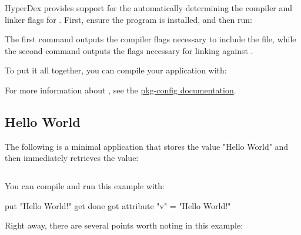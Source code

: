 HyperDex provides support for the automatically determining the compiler and
linker flags for .  First, ensure the 
program is installed, and then run:

\begin{consolecode}
\end{consolecode}

The first command outputs the compiler flags necessary to include the
 file, while the second command outputs the flags
necessary for linking against .

To put it all together, you can compile your application with:

\begin{consolecode}
\end{consolecode}

For more information about , see the
\href{http://people.freedesktop.org/~dbn/pkg-config-guide.html#using}{pkg-config
documentation}.

\subsection{Hello World}
\label{sec:api:c:client:helloworld}

The following is a minimal application that stores the value "Hello World" and
then immediately retrieves the value:

\inputminted{c}{\topdir/api/c/hello-world.c}

You can compile and run this example with:

\begin{consolecode}
put "Hello World!"
get done
got attribute "v" = "Hello World!"
\end{consolecode}

Right away, there are several points worth noting in this example:

